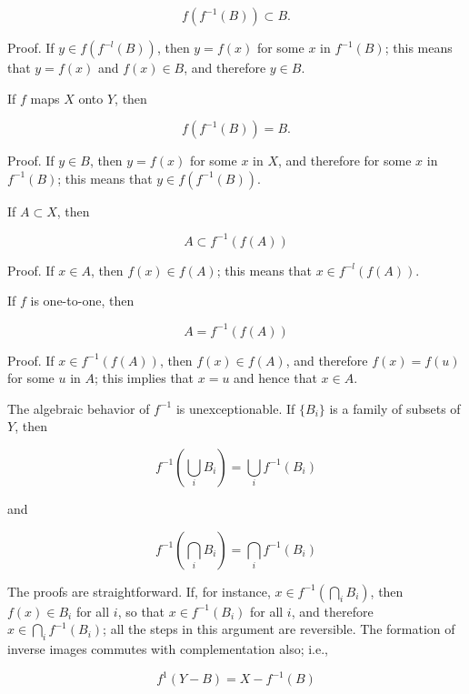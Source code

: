 \begin{equation*} 
f(f^{-1}(B)) \subset B.
\end{equation*}

Proof. If $y \in f(f^{-l}(B))$, then $y = f(x)$ for some $x$ in $f^{-1}(B)$; this means that $y = f(x)$ and $f(x) \in B$, and therefore $y \in B$. 

If $f$ maps $X$ onto $Y$, then 

\begin{equation*} 
f(f^{-1}(B)) = B.
\end{equation*}

Proof. If $y \in B$, then $y = f(x)$ for some $x$ in $X$, and therefore for some $x$ in $f^{-1}(B)$; this means that $y \in f(f^{-1}(B))$. 

If $A \subset X$, then 

\begin{equation*}
A \subset f^{-1}(f(A))
\end{equation*}

Proof. If $x \in A$, then $f(x) \in f(A)$; this means that $x \in f^{-l}(f(A))$.

If $f$ is one-to-one, then 

\begin{equation*}
A = f^{-1}(f(A))
\end{equation*}

Proof. If $x \in f^{-1}(f(A))$, then $f(x) \in f(A)$, and therefore $f(x) = f(u)$ for some $u$ in $A$; this implies that $x = u$ and hence that $x \in A$. 


The algebraic behavior of $f^{-1}$ is unexceptionable. If $ \{ B_{i} \} $ is a family of subsets of $Y$, then 

\begin{equation*}
f^{-1}( \bigcup_{i} B_{i} ) = \bigcup_{i}f^{-1}(B_{i})
\end{equation*}

and

\begin{equation*}
f^{-1}( \bigcap_{i} B_{i} ) = \bigcap_{i}f^{-1}(B_{i})
\end{equation*}

The proofs are straightforward. If, for instance, $x \in f^{-1}( \bigcap_{i} B_{i})$, then $f(x) \in B_{i}$ for all $i$, so that $x \in f^{-1}(B_{i})$ for all $i$, and therefore $x \in \bigcap_{i}f^{-1}(B_{i})$; all the steps in this argument are reversible. The formation of inverse images commutes with complementation also; i.e., 

\begin{equation*}
f^{1}(Y - B) = X - f^{-1}(B)
\end{equation*}

